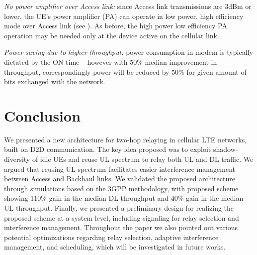 \documentclass[journal]{IEEEtran}
\begin{document}
{\em No power amplifier over Access link:} since Access link transmissions are 3dBm or lower, the UE's power amplifier (PA) can operate in low power, high efficiency mode over Access link (see \cite[Fig.~7]{JensenLauridsen12}). As before, the high power low efficiency PA operation may be needed only at the device active on the cellular link.

{\em Power saving due to higher throughput:} power consumption in modem is typically dictated by the ON time -- however with $50\%$ median improvement in throughput, correspondingly power will be reduced by $50\%$ for given amount of bits exchanged with the network.

\section{Conclusion}
\label{sec:conclusion}
We presented a new architecture for two-hop relaying in cellular LTE networks, built on D2D communication.
The key idea proposed was to exploit shadow-diversity of idle UEs and reuse UL spectrum to relay both UL and DL traffic.
We argued that reusing UL spectrum facilitates easier interference management between Access and Backhaul links.
We validated the proposed architecture through simulations based on the 3GPP methodology, with proposed scheme showing 110\% gain in the median DL throughput and 40\% gain in the median UL throughput.
Finally, we presented a preliminary design for realizing the proposed scheme at a system level, including signaling for relay selection and interference management.
Throughout the paper we also pointed out various potential optimizations regarding relay selection, adaptive interference management, and scheduling, which will be investigated in future works.
\end{document}
